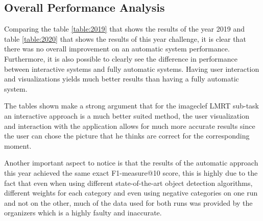 \subsection{Overall Performance Analysis}

Comparing the table \ref{table:2019} that shows the results of the year 2019 and table \ref{table:2020} that shows the results of this year challenge, it is clear that there was no overall improvement on an automatic system performance. Furthermore, it is also possible to clearly see the difference in performance between interactive systems and fully automatic systems. Having user interaction and visualizations yields much better results than having a fully automatic system.

The tables shown make a strong argument that for the imageclef LMRT sub-task an interactive approach is a much better suited method, the user visualization and interaction with the application allows for much more accurate results since the user can chose the picture that he thinks are correct for the corresponding moment.

Another important aspect to notice is that the results of the automatic approach this year achieved the same exact F1-measure@10 score, this is highly due to the fact that even when using different state-of-the-art object detection algorithms, different weights for each category and even using negative categories on one run and not on the other, much of the data used for both runs was provided by the organizers which is a highly faulty and inaccurate.



